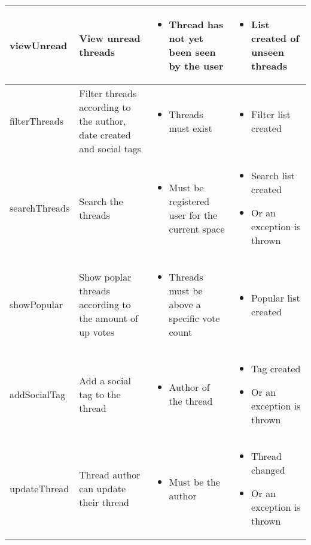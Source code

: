 \documentclass{report}
\begin{document}
\begin{longtable}{@{}|p{2.5cm}|p{3cm}|p{4cm}|p{4cm}|@{}}
			viewUnread& View unread threads& \begin{itemize} \item Thread has not yet been seen by the user \end{itemize}& \begin{itemize} \item List created of unseen threads \end{itemize} \\ \midrule
			
			filterThreads& Filter threads according to the author, date created and social tags& \begin{itemize} \item Threads must exist \end{itemize}& \begin{itemize} \item Filter list created \end{itemize} \\ \midrule
			
			searchThreads& Search the threads& \begin{itemize} \item Must be registered user for the current space \end{itemize}& \begin{itemize} \item Search list created \item Or an exception is thrown \end{itemize} \\ \midrule
			
			showPopular& Show poplar threads according to the amount of up votes& \begin{itemize} \item Threads must be above a specific vote count \end{itemize}& \begin{itemize} \item Popular list created \end{itemize} \\ \midrule
			
			addSocialTag& Add a social tag to the thread& \begin{itemize} \item Author of the thread \end{itemize}& \begin{itemize} \item Tag created \item Or an exception is thrown \end{itemize} \\ \midrule
			
			updateThread& Thread author can update their thread& \begin{itemize} \item Must be the author \end{itemize}& \begin{itemize} \item Thread changed \item Or an exception is thrown \end{itemize} \\ \bottomrule
		                 
		\end{longtable}
\end{document}
